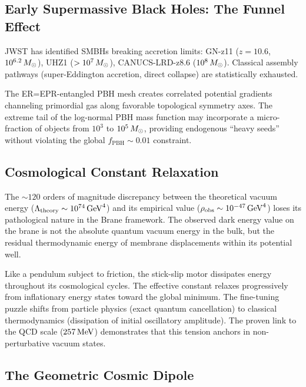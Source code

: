 \subsection{Early Supermassive Black Holes: The Funnel Effect}
\label{sec:early_smbh}

JWST has identified SMBHs breaking accretion limits: GN-z11 ($z = 10.6$, $10^{6.2}\,M_\odot$), UHZ1 ($> 10^7\,M_\odot$), CANUCS-LRD-z8.6 ($10^8\,M_\odot$). Classical assembly pathways (super-Eddington accretion, direct collapse) are statistically exhausted.

The ER=EPR-entangled PBH mesh creates correlated potential gradients channeling primordial gas along favorable topological symmetry axes. The extreme tail of the log-normal PBH mass function may incorporate a micro-fraction of objects from $10^3$ to $10^5\,M_\odot$, providing endogenous ``heavy seeds'' without violating the global $f_\text{PBH} \sim 0.01$ constraint.

\subsection{Cosmological Constant Relaxation}
\label{sec:cc_relaxation}

The $\sim 120$ orders of magnitude discrepancy between the theoretical vacuum energy ($\Lambda_\text{theory} \sim 10^{74}\,\text{GeV}^4$) and its empirical value ($\rho_\text{obs} \sim 10^{-47}\,\text{GeV}^4$) loses its pathological nature in the Brane framework. The observed dark energy value on the brane is not the absolute quantum vacuum energy in the bulk, but the residual thermodynamic energy of membrane displacements within its \AdS{} potential well.

Like a pendulum subject to friction, the stick-slip motor dissipates energy throughout its cosmological cycles. The effective constant relaxes progressively from inflationary energy states toward the global minimum. The fine-tuning puzzle shifts from particle physics (exact quantum cancellation) to classical thermodynamics (dissipation of initial oscillatory amplitude). The proven link to the QCD scale ($257\,\text{MeV}$) demonstrates that this tension anchors in non-perturbative vacuum states.

\subsection{The Geometric Cosmic Dipole}
\label{sec:cosmic_dipole}


